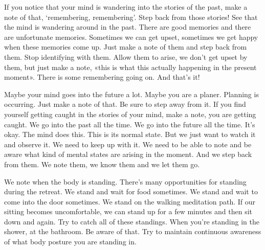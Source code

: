 \documentclass[letterpaper,10pt,english]{sphinxmanual}
\begin{document}
\sphinxAtStartPar
If you notice that your mind is wandering into the stories of the past,
make  a  note  of  that,  ‘remembering,  remembering’.  Step  back  from  those
stories! See that the mind is wandering around in the past. There are good
memories and there are unfortunate memories. Sometimes we can get upset,
sometimes we get happy when these memories come up. Just make a note
of them and step back from them. Stop identifying with them. Allow them
to  arise,  we  don’t  get  upset  by  them,  but  just  make  a  note,  «this  is  what
this actually happening in the present moment». There is some remembering
going on. And that’s it!

\sphinxAtStartPar
Maybe your mind goes into the future a lot. Maybe you are a planer.
Planning is occurring. Just make a note of that. Be sure to step away from it.
If you find yourself getting caught in the stories of your mind, make
a note, you are getting caught. We go into the past all the time. We go into
the future all the time. It’s okay. The mind does this. This is its normal state.
But we just want to watch it and observe it. We need to keep up with it. We
  need to be able to note and be aware what kind of mental states are arising
in the moment. And we step back from them. We note them, we know them
and we let them go.

\sphinxAtStartPar
We  note  when  the  body  is  standing.  There’s  many  opportunities  for
standing during the retreat. We stand and wait for food sometimes. We stand
and wait to come into the door sometimes. We stand on the walking meditation path. If our sitting becomes uncomfortable, we can stand up for a few
minutes  and  then  sit  down  and  again.  Try  to  catch  all  of  these  standings.
When you’re standing in the shower, at the bathroom. Be aware of that. Try
to maintain continuous awareness of what body posture you are standing in.
\end{document}
